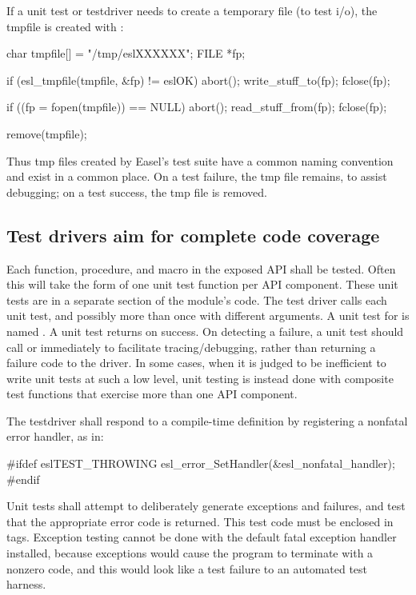 If a unit test or testdriver needs to create a temporary file (to test
i/o), the tmpfile is created with :

\begin{cchunk}
   char  tmpfile[] = "/tmp/eslXXXXXX";
   FILE *fp;

   if (esl_tmpfile(tmpfile, &fp) != eslOK) abort();
   write_stuff_to(fp);
   fclose(fp);

   if ((fp = fopen(tmpfile)) == NULL)      abort();
   read_stuff_from(fp);
   fclose(fp);

   remove(tmpfile);
\end{cchunk}

Thus tmp files created by Easel's test suite have a common naming
convention and exist in a common place. On a test failure, the tmp
file remains, to assist debugging; on a test success, the tmp file is
removed.

\subsection{Test drivers aim for complete code coverage}

Each function, procedure, and macro in the exposed API shall be
tested. Often this will take the form of one unit test function per
API component. These unit tests are in a separate section of the
module's code. The test driver calls each unit test, and possibly more
than once with different arguments.  A unit test for
 is named . A
unit test returns  on success.  On detecting a failure, a
unit test should call  or 
immediately to facilitate tracing/debugging, rather than returning a
failure code to the driver. In some cases, when it is judged to be
inefficient to write unit tests at such a low level, unit testing is
instead done with composite test functions that exercise more than one
API component.

The testdriver shall respond to a 
compile-time definition by registering a nonfatal error handler, as
in:
\begin{cchunk}
      #ifdef eslTEST_THROWING
        esl_error_SetHandler(&esl_nonfatal_handler);
      #endif
\end{cchunk}

Unit tests shall attempt to deliberately generate exceptions and
failures, and test that the appropriate error code is returned.  This
test code must be enclosed in  tags.
Exception testing cannot be done with the default fatal exception
handler installed, because exceptions would cause the program to
terminate with a nonzero code, and this would look like a test failure
to an automated test harness.

